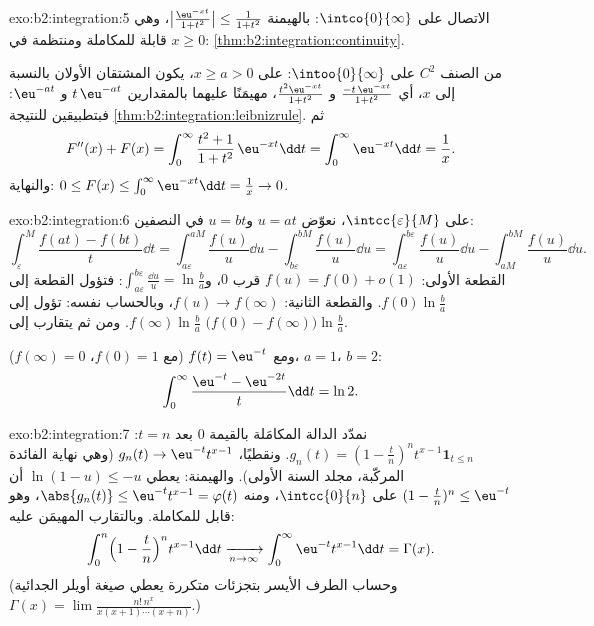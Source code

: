 \begin{solution}{exo:b2:integration:5}
الاتصال على $\intco{0}{\infty}$: بالهيمنة
$\bigl|\frac{\eu^{-xt}}{1+t^2}\bigr| \leq \frac{1}{1+t^2}$،
وهي قابلة للمكاملة ومنتظمة في $x \geq 0$:
\cref{thm:b2:integration:continuity}.

من الصنف $C^2$ على $\intoo{0}{\infty}$: على $x \geq a > 0$، يكون المشتقان
الأولان بالنسبة إلى $x$، أي $\frac{-t\,\eu^{-xt}}{1+t^2}$ و
$\frac{t^2\eu^{-xt}}{1+t^2}$، مهيمَنًا عليهما بالمقدارين $t\,\eu^{-at}$ و
$\eu^{-at}$: فبتطبيقين للنتيجة
\cref{thm:b2:integration:leibnizrule}. ثم
\[
F''(x) + F(x) = \int_0^\infty \frac{t^2 + 1}{1 + t^2}\,\eu^{-xt}\dd
t = \int_0^\infty \eu^{-xt}\dd t = \frac1x .
\]
والنهاية: $0 \leq F(x) \leq \int_0^\infty \eu^{-xt}\dd t = \frac1x \to
0$.
\end{solution}

\begin{solution}{exo:b2:integration:6}
على $\intcc{\varepsilon}{M}$، نعوّض $u = at$ و$u = bt$ في
النصفين:
\[
\int_\varepsilon^M \frac{f(at) - f(bt)}{t}\dd t
= \int_{a\varepsilon}^{aM}\frac{f(u)}{u}\dd u
- \int_{b\varepsilon}^{bM}\frac{f(u)}{u}\dd u
= \int_{a\varepsilon}^{b\varepsilon} \frac{f(u)}{u}\dd u
- \int_{aM}^{bM} \frac{f(u)}{u}\dd u .
\]
القطعة الأولى: $f(u) = f(0) + o(1)$ قرب $0$، و$\int_{a\varepsilon}
^{b\varepsilon} \frac{\dd u}{u} = \ln\frac ba$: فتؤول القطعة إلى
$f(0)\ln\frac ba$. والقطعة الثانية: $f(u) \to f(\infty)$، وبالحساب نفسه:
تؤول إلى $f(\infty)\ln\frac ba$. ومن ثم يتقارب  إلى $\bigl(f(0) - f(\infty)\bigr)\ln\frac ba$.

ومع $f(t) = \eu^{-t}$ (مع $f(0) = 1$، $f(\infty) = 0$)، $a = 1$، $b
= 2$:
\[
\int_0^\infty \frac{\eu^{-t} - \eu^{-2t}}{t}\dd t = \ln 2 .
\]
\end{solution}

\begin{solution}{exo:b2:integration:7}
نمدّد الدالة المكامَلة بالقيمة $0$ بعد $t = n$: $g_n(t) = (1 -
\frac tn)^n t^{x-1}\mathbf{1}_{t \leq n}$. ونقطيًا، $g_n(t) \to
\eu^{-t}t^{x-1}$ (وهي نهاية الفائدة المركّبة، مجلد السنة الأولى).
والهيمنة: يعطي $\ln(1 - u) \leq -u$ أن $(1 - \frac tn)^n \leq
\eu^{-t}$ على $\intcc{0}{n}$، ومنه $\abs{g_n(t)} \leq
\eu^{-t}t^{x-1} = \varphi(t)$، وهو قابل للمكاملة. وبالتقارب المهيمَن عليه:
\[
\int_0^n \Bigl(1 - \frac tn\Bigr)^n t^{x-1}\dd t
\xrightarrow[n\to\infty]{} \int_0^\infty \eu^{-t}t^{x-1}\dd t
= \Gamma(x) .
\]
(وحساب الطرف الأيسر بتجزئات متكررة يعطي صيغة أويلر الجدائية
$\Gamma(x) = \lim \frac{n!\,n^x}{x(x+1)\cdots(x+n)}$.)
\end{solution}

